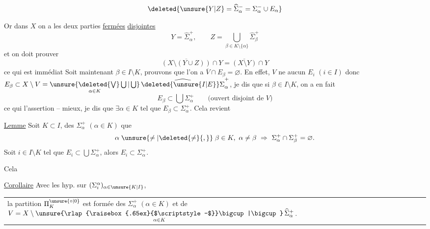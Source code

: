     
\[
\deleted{\unsure{Y|Z}=\widehat{\Sigma}_\alpha^-=\Sigma_\alpha^-\cup E_\alpha}
\]

Or dans $X$ on a les deux parties \uline{fermées} \uline{disjointes}
\[
Y=\widehat{\Sigma}_\alpha^+,\qquad Z=\bigcup_{\beta\in K\setminus\{\alpha\}}\widehat{\Sigma}_\beta^+
\]
et on doit prouver
\[
\overline{(X\setminus(Y\cup Z))}\cap Y=\overline{(X\setminus Y)}\cap Y
\]
ce qui est immédiat
Soit maintenant $\beta\in I\setminus K$, prouvons que l'on a $\overline V\cap E_\beta=\varnothing$. En effet, $V$ ne   aucun $E_i$ $(i\in I)$ donc $E_\beta\subset X\setminus V=\mathop{\unsure{\deleted{\bigvee}\bigcup|\bigcup}}\limits_{\alpha\in K}\widehat{\deleted{\unsure{I|E}}\Sigma}_\alpha^+$,  je dis que si $\beta\in I\setminus K$, on a en fait
\[
E_\beta\subset\bigcup\Sigma_\alpha^+\qquad\text{(ouvert disjoint de }V\text{)}
\]
\reversemarginpar{}\normalmarginpar
ce qui  l'assertion -- mieux, je dis que $\exists\alpha\in K$ tel que $E_\beta\subset\Sigma_\alpha^+$. Cela revient 

\uline{Lemme} Soit $K\subset I$,   des $\Sigma_\alpha^+$ $(\alpha\in K)$  que
\[
\alpha\mathrel{\unsure{\ne|\deleted{\ne}{,}}}\beta\in K,\ \alpha\ne\beta\ \Rightarrow\ \Sigma_\alpha^+\cap\Sigma_\beta^+=\varnothing.
\]
Soit $i\in I\setminus K$ tel que $E_i\subset\bigcup\Sigma_\alpha^+$, alors   $E_i\subset\Sigma_\alpha^+$.

Cela   

\uline{Corollaire} Avec les hyp.  sur $(\Sigma_i^\alpha)_{\alpha\in\unsure{K|I}}$,

\noindent\begin{tabular}{@{}|p{.96\linewidth}@{}}
la partition $\Pi_K^{\unsure{\circ|0}}$ est formée des $\Sigma_\alpha^+$ $(\alpha\in K)$ et de $V=X\setminus\mathop{\unsure{\rlap{\raisebox{.65ex}{$\scriptstyle-$}}\bigcup|\bigcup}}\limits_{\alpha\in K}\widehat{\Sigma}_\alpha^+$.
\end{tabular}

